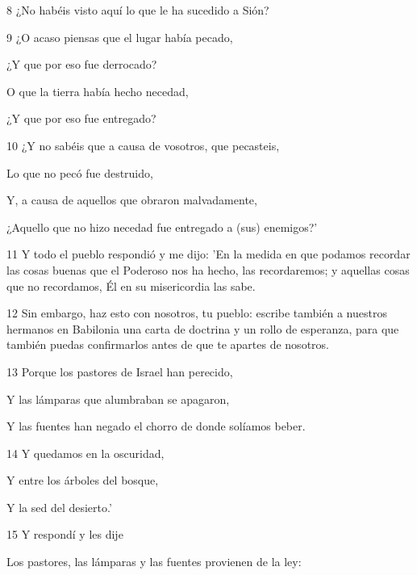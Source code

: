 \par 8 ¿No habéis visto aquí lo que le ha sucedido a Sión?

\par 9 ¿O acaso piensas que el lugar había pecado,

\par ¿Y que por eso fue derrocado?

\par O que la tierra había hecho necedad,

\par ¿Y que por eso fue entregado?

\par 10 ¿Y no sabéis que a causa de vosotros, que pecasteis,

\par Lo que no pecó fue destruido,

\par Y, a causa de aquellos que obraron malvadamente,

\par ¿Aquello que no hizo necedad fue entregado a (sus) enemigos?'

\par 11 Y todo el pueblo respondió y me dijo: 'En la medida en que podamos recordar las cosas buenas que el Poderoso nos ha hecho, las recordaremos; y aquellas cosas que no recordamos, Él en su misericordia las sabe.

\par 12 Sin embargo, haz esto con nosotros, tu pueblo: escribe también a nuestros hermanos en Babilonia una carta de doctrina y un rollo de esperanza, para que también puedas confirmarlos antes de que te apartes de nosotros.

\par 13 Porque los pastores de Israel han perecido,

Y las lámparas que alumbraban se apagaron,

\par Y las fuentes han negado el chorro de donde solíamos beber.

\par 14 Y quedamos en la oscuridad,

\par Y entre los árboles del bosque,

\par Y la sed del desierto.'

\par 15 Y respondí y les dije

\par Los pastores, las lámparas y las fuentes provienen de la ley:

